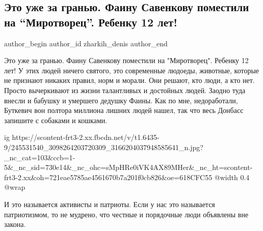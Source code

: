  
 
 
 
 
 
\subsection{Это уже за гранью. Фаину Савенкову поместили на \enquote{Миротворец}. Ребенку 12 лет!}
\label{sec:13_10_2021.fb.zharkih_denis.2.savenkova_mirotvorec}
 
\ifcmt
 author_begin
   author_id zharkih_denis
 author_end
\fi

Это уже за гранью. Фаину Савенкову поместили на "Миротворец". Ребенку 12 лет! У
этих людей ничего святого, это современные людоеды, животные, которые не
признают никаких правил, норм и морали. Они решают, кто люди, а кто нет. Просто
вычеркивают из жизни талантливых и достойных людей. Заодно туда внесли и
бабушку и умершего дедушку Фаины. Как по мне, недоработали, Буткевич вон
полтора миллиона лишних людей нашел, так что весь Донбасс запишите с собаками и
кошками.

\ifcmt
  ig https://scontent-frt3-2.xx.fbcdn.net/v/t1.6435-9/245531540_3098264203720309_3166204037948585641_n.jpg?_nc_cat=103&ccb=1-5&_nc_sid=730e14&_nc_ohc=sMpHRe0iVK4AX89MHer&_nc_ht=scontent-frt3-2.xx&oh=721eae5785ae4561670b7a201f0cb826&oe=618CFC55
  @width 0.4
  @wrap 
\fi

И это называется активисты и патриоты. Если у нас это называется патриотизмом,
то не мудрено, что честные и порядочные люди объявлены вне закона.

